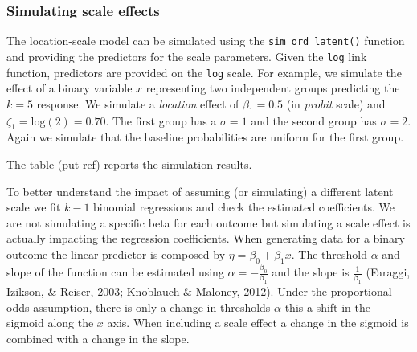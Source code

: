 \documentclass[
  man,floatsintext]{apa6}
\begin{document}
\normalsize

\subsubsection{Simulating scale effects}\label{simulating-scale-effects}

The location-scale model can be simulated using the \texttt{sim\_ord\_latent()} function and providing the predictors for the scale parameters. Given the \texttt{log} link function, predictors are provided on the \texttt{log} scale. For example, we simulate the effect of a binary variable \(x\) representing two independent groups predicting the \(k = 5\) response. We simulate a \emph{location} effect of \(\beta_1 = 0.5\) (in \emph{probit} scale) and \(\zeta_1 = \text{log}(2) = 0.70\). The first group has a \(\sigma = 1\) and the second group has \(\sigma = 2\). Again we simulate that the baseline probabilities are uniform for the first group.

\scriptsize

\normalsize

The table (put ref) reports the simulation results.

\scriptsize

\normalsize

To better understand the impact of assuming (or simulating) a different latent scale we fit \(k - 1\) binomial regressions and check the estimated coefficients. We are not simulating a specific beta for each outcome but simulating a scale effect is actually impacting the regression coefficients. When generating data for a binary outcome the linear predictor is composed by \(\eta = \beta_0 + \beta_1x\). The threshold \(\alpha\) and slope of the function can be estimated using \(\alpha = -\frac{\beta_0}{\beta_1}\) and the slope is \(\frac{1}{\beta_1}\) (Faraggi, Izikson, \& Reiser, 2003; Knoblauch \& Maloney, 2012). Under the proportional odds assumption, there is only a change in thresholds \(\alpha\) this a shift in the sigmoid along the \(x\) axis. When including a scale effect a change in the sigmoid is combined with a change in the slope.

\scriptsize
\end{document}
